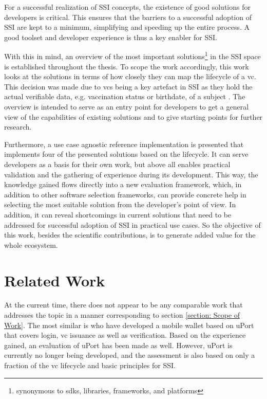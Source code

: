 	For a successful realization of \acf{SSI} concepts, the existence of good solutions for developers is critical. This ensures that the barriers to a successful adoption of \ac{SSI} are kept to a minimum, simplifying and speeding up the entire process. A good toolset and developer experience is thus a key enabler for \ac{SSI}.
	
	With this in mind, an overview of the most important solutions\footnote{synonymous to \acp{sdk}, libraries, frameworks, and platforms} in the \ac{SSI} space is established throughout the thesis. To scope the work accordingly, this work looks at the solutions in terms of how closely they can map the lifecycle of a \acf{vc}. This decision was made due to \acsp{vc} being a key artefact in \ac{SSI} as they hold the actual verifiable data, e.g. vaccination status or birthdate, of a subject \cite{manu_sporny_verifiable_2019}. The overview is intended to serve as an entry point for developers to get a general view of the capabilities of existing solutions and to give starting points for further research. 
	
	Furthermore, a use case agnostic reference implementation is presented that implements four of the presented solutions based on the lifecycle. It can serve developers as a basis for their own work, but above all enables practical validation and the gathering of experience during its development. This way, the knowledge gained flows directly into a new evaluation framework, which, in addition to other software selection frameworks, can provide concrete help in selecting the most suitable solution from the developer's point of view. In addition, it can reveal shortcomings in current solutions that need to be addressed for successful adoption of \ac{SSI} in practical use cases. So the objective of this work, besides the scientific contributions, is to generate added value for the whole ecosystem.
	
	\section{Related Work} %
	
	At the current time, there does not appear to be any comparable work that addresses the topic in a manner corresponding to section \ref{section: Scope of Work}. The most similar is \cite{naik_uport_2020} who have developed a mobile wallet based on uPort that covers login, \ac{vc} issuance as well as verification. Based on the experience gained, an evaluation of uPort has been made as well. However, uPort is currently no longer being developed, and the assessment is also based on only a fraction of the \acs{vc} lifecycle and basic principles for \ac{SSI}.
	

